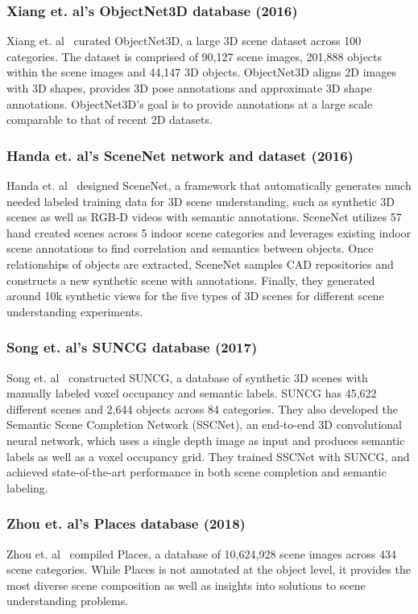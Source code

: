 \subsubsection{Xiang et. al's ObjectNet3D database  (2016)}
Xiang et. al~\cite{DBLP:conf/eccv/XiangKCJCSMGS16} curated ObjectNet3D, a large 3D scene dataset across 100 categories. The dataset is comprised of 90,127 scene images, 201,888 objects within the scene images and 44,147 3D objects. ObjectNet3D aligns 2D images with 3D shapes, provides 3D pose annotations and approximate 3D shape annotations. ObjectNet3D's goal is to provide annotations at a large scale comparable to that of recent 2D datasets.

\subsubsection{Handa et. al's SceneNet network and dataset (2016)}
Handa et. al~\cite{DBLP:conf/icra/HandaPSC16} designed SceneNet, a framework that automatically generates much needed labeled training data  for 3D scene understanding, such as synthetic 3D scenes as well as RGB-D videos with semantic annotations. SceneNet utilizes 57 hand created scenes across 5 indoor scene categories and leverages existing indoor scene annotations to find correlation and semantics between objects. Once relationships of objects are extracted, SceneNet samples CAD repositories and constructs a new synthetic scene with annotations. Finally, they generated around 10k synthetic views for the five types of 3D scenes for different scene understanding experiments. 

\subsubsection{Song et. al's SUNCG database (2017)}
Song et. al~\cite{DBLP:conf/cvpr/SongYZCSF17} constructed SUNCG,  a database of synthetic 3D scenes with manually labeled voxel occupancy and semantic labels. SUNCG has 45,622 different scenes and 2,644 objects across 84 categories. They also developed the Semantic Scene Completion Network (SSCNet), an end-to-end 3D convolutional neural network, which uses a single depth image as input and produces semantic labels as well as a voxel occupancy grid. They trained SSCNet with SUNCG, and achieved state-of-the-art performance in both scene completion and semantic labeling. 


\subsubsection{Zhou et. al's Places database (2018)}
Zhou et. al~\cite{DBLP:journals/pami/ZhouLKO018} compiled Places, a database of 10,624,928 scene images across 434 scene categories. While Places is not annotated at the object level, it provides the most diverse scene composition as well as insights into solutions to scene understanding problems.



